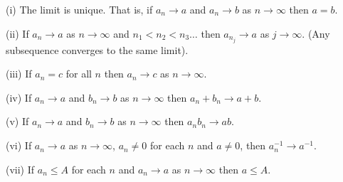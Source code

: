 \begin{lemma}\label{lem:basic_convergence_real}
\ben
\item [(i)] The limit is unique. That is, if $a_n \rightarrow a$ and $a_n \rightarrow b$ as $n \rightarrow \infty$ then $a=b$.
\item [(ii)] If $a_n \rightarrow a$ as $n \rightarrow \infty$ and $n_1 < n_2 < n_3 \ldots$ then $a_{n_j} \rightarrow a$ as $j \rightarrow \infty$. (Any subsequence converges to the same limit).
\item [(iii)]  If $a_n = c$ for all $n$ then $a_n \rightarrow c$ as $n \rightarrow \infty$.
\item [(iv)] If $a_n \rightarrow a$ and $b_n \rightarrow b$ as $n \rightarrow \infty$ then $a_n + b_n \rightarrow a + b$.
\item [(v)] If $a_n \rightarrow a$ and $b_n \rightarrow b$ as $n \rightarrow \infty$ then $a_n b_n \rightarrow ab$.
\item [(vi)] If $a_n \rightarrow a$ as $n \rightarrow \infty$, $a_n \neq 0$ for each $n$ and $a \neq 0$, then $a_n^{-1} \rightarrow  a^{-1}$.
\item [(vii)] If $a_n\leq A$ for each $n$ and $a_n\rightarrow a$ as $n\rightarrow\infty$ then $a\leq A$.
\een
\end{lemma}

